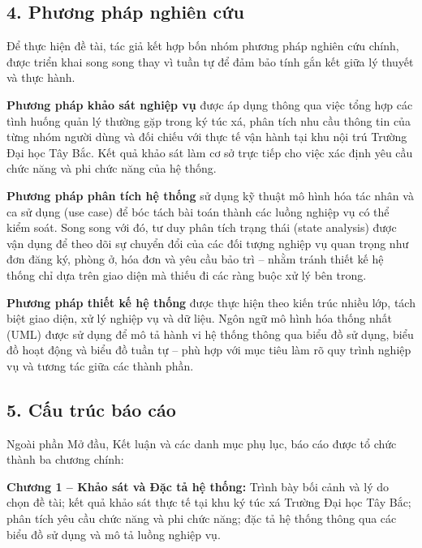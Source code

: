 \documentclass[13pt,a4paper]{extarticle}
\numberwithin{figure}{section}
\numberwithin{table}{section}
\begin{document}
	\subsection*{4. Phương pháp nghiên cứu}
	
	Để thực hiện đề tài, tác giả kết hợp bốn nhóm phương pháp nghiên cứu chính, được triển khai song song thay vì tuần tự để đảm bảo tính gắn kết giữa lý thuyết và thực hành.
	
	\textbf{Phương pháp khảo sát nghiệp vụ} được áp dụng thông qua việc tổng hợp các tình huống quản lý thường gặp trong ký túc xá, phân tích nhu cầu thông tin của từng nhóm người dùng và đối chiếu với thực tế vận hành tại khu nội trú Trường Đại học Tây Bắc. Kết quả khảo sát làm cơ sở trực tiếp cho việc xác định yêu cầu chức năng và phi chức năng của hệ thống.
	
	\textbf{Phương pháp phân tích hệ thống} sử dụng kỹ thuật mô hình hóa tác nhân và ca sử dụng (use case) để bóc tách bài toán thành các luồng nghiệp vụ có thể kiểm soát. Song song với đó, tư duy phân tích trạng thái (state analysis) được vận dụng để theo dõi sự chuyển đổi của các đối tượng nghiệp vụ quan trọng như đơn đăng ký, phòng ở, hóa đơn và yêu cầu bảo trì -- nhằm tránh thiết kế hệ thống chỉ dựa trên giao diện mà thiếu đi các ràng buộc xử lý bên trong.
	
	\textbf{Phương pháp thiết kế hệ thống} được thực hiện theo kiến trúc nhiều lớp, tách biệt giao diện, xử lý nghiệp vụ và dữ liệu. Ngôn ngữ mô hình hóa thống nhất (UML) được sử dụng để mô tả hành vi hệ thống thông qua biểu đồ sử dụng, biểu đồ hoạt động và biểu đồ tuần tự -- phù hợp với mục tiêu làm rõ quy trình nghiệp vụ và tương tác giữa các thành phần.
	
	\subsection*{5. Cấu trúc báo cáo}
	
	Ngoài phần Mở đầu, Kết luận và các danh mục phụ lục, báo cáo được tổ chức thành ba chương chính:
	
	\textbf{Chương 1 -- Khảo sát và Đặc tả hệ thống:} Trình bày bối cảnh và lý do chọn đề tài; kết quả khảo sát thực tế tại khu ký túc xá Trường Đại học Tây Bắc; phân tích yêu cầu chức năng và phi chức năng; đặc tả hệ thống thông qua các biểu đồ sử dụng và mô tả luồng nghiệp vụ.
	
\end{document}
